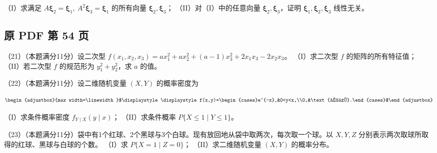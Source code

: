 \documentclass[UTF8,12pt]{ctexart}
\newcommand{\fitmath}[1]{\begin{adjustbox}{max width=\linewidth}$\displaystyle #1$\end{adjustbox}}
\begin{document}
（I）求满足 \(\displaystyle A\boldsymbol\xi_2=\boldsymbol\xi_1,\allowbreak \ A^2\boldsymbol\xi_3=\boldsymbol\xi_1\) 的所有向量 \(\displaystyle \boldsymbol\xi_2,\allowbreak \boldsymbol\xi_3\)；
（II）对（I）中的任意向量 \(\displaystyle \boldsymbol\xi_2,\allowbreak \boldsymbol\xi_3\)，证明 \(\displaystyle \boldsymbol\xi_1,\allowbreak \boldsymbol\xi_2,\allowbreak \boldsymbol\xi_3\) 线性无关。


\clearpage

\subsection*{原 PDF 第 54 页}

（21）（本题满分11分）设二次型 \(\displaystyle f(x_1,\allowbreak x_2,\allowbreak x_3)=ax_1^2+ax_2^2+(a-1)x_3^2+2x_1x_3-2x_2x_3\)。
（I）求二次型 \(\displaystyle f\) 的矩阵的所有特征值；
（II）若二次型 \(\displaystyle f\) 的规范形为 \(\displaystyle y_1^2+y_2^2\)，求 \(\displaystyle a\) 的值。


（22）（本题满分11分）设二维随机变量 \(\displaystyle (X,\allowbreak Y)\) 的概率密度为


\[\fitmath{\displaystyle f(x,y)=\begin{cases}e^{-x},&0<y<x,\\0,&\text{其他}.\end{cases}}\]


（I）求条件概率密度 \(\displaystyle f_{Y\mid X}(y\mid x)\)；
（II）求条件概率 \(\displaystyle P\{X\le1\mid Y\le1\}\)。


（23）（本题满分11分）袋中有1个红球、2个黑球与3个白球。现有放回地从袋中取两次，每次取一个球。以 \(\displaystyle X,\allowbreak Y,\allowbreak Z\) 分别表示两次取球所取得的红球、黑球与白球的个数。
（I）求 \(\displaystyle P\{X=1\mid Z=0\}\)；
（II）求二维随机变量 \(\displaystyle (X,\allowbreak Y)\) 的概率分布。


\clearpage
\end{document}
